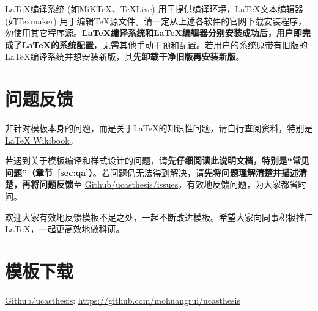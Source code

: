 \LaTeX{}编译系统 (如MiK\TeX{}、\TeX{}Live) 用于提供编译环境，\LaTeX{}文本编辑器 (如Texmaker) 用于编辑\TeX{}源文件。请一定从上述各软件的官网下载安装程序，勿使用其它程序源。\textbf{\LaTeX{}编译系统和\LaTeX{}编辑器分别安装成功后，用户即完成了\LaTeX{}的系统配置}，无需其他手动干预和配置。若用户的系统原带有旧版的\LaTeX{}编译系统并想安装新版，其\textbf{先卸载干净旧版再安装新版}。

\section{问题反馈}

非针对模板本身的问题，而是关于\LaTeX{}的知识性问题，请自行查阅资料，特别是 \href{https://en.wikibooks.org/wiki/LaTeX}{\LaTeX{} Wikibook}。

若遇到关于模板编译和样式设计的问题，请\textbf{先仔细阅读此说明文档，特别是“常见问题”（章节~\ref{sec:qa}）}。若问题仍无法得到解决，请\textbf{先将问题理解清楚并描述清楚，再将问题反馈}至 \href{https://github.com/mohuangrui/ucasthesis/issues}{Github/ucasthesis/issues}。有效地反馈问题，为大家都省时间。

欢迎大家有效地反馈模板不足之处，一起不断改进模板。希望大家向同事积极推广\LaTeX{}，一起更高效地做科研。

\section{模板下载}

\begin{center}
    \href{https://github.com/mohuangrui/ucasthesis}{Github/ucasthesis}: \url{https://github.com/mohuangrui/ucasthesis}
\end{center}
